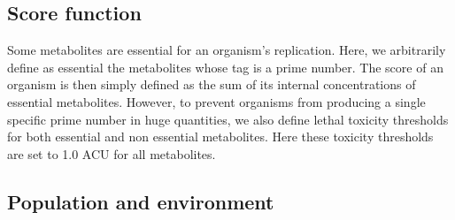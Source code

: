 
\subsection{Score function}

Some metabolites are essential for an organism's replication. Here, we arbitrarily define as essential the metabolites whose tag is a prime number. The score of an organism is then simply defined as the sum of its internal concentrations of essential metabolites. However, to prevent organisms from producing a single specific prime number in huge quantities, we also define lethal toxicity thresholds for both essential and non essential metabolites. Here these toxicity thresholds are set to 1.0 ACU for all metabolites.


\subsection{Population and environment}

